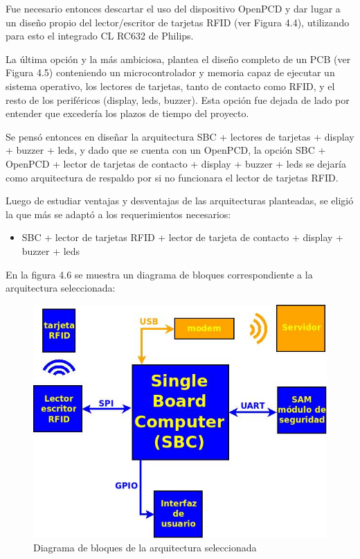 Fue necesario entonces descartar el uso del dispositivo OpenPCD y dar lugar a un diseño propio del lector/escritor de tarjetas RFID (ver Figura 4.4), utilizando para esto el integrado CL RC632 de Philips.

La última opción y la más ambiciosa, plantea el diseño completo de un PCB (ver Figura 4.5) conteniendo un microcontrolador y memoria capaz de ejecutar un sistema operativo, los lectores de tarjetas, tanto de contacto como RFID, y el resto de los periféricos (display, leds, buzzer). Esta opción fue dejada de lado por entender que excedería los plazos de tiempo del proyecto.

Se pensó entonces en diseñar la arquitectura SBC + lectores de tarjetas + display + buzzer + leds, y dado que se cuenta con un OpenPCD, la opción SBC + OpenPCD + lector de tarjetas de contacto + display + buzzer + leds se dejaría como arquitectura de respaldo por si no funcionara el lector de tarjetas RFID.

Luego de estudiar ventajas y desventajas de las arquitecturas planteadas, se eligió la que más se adaptó a los requerimientos necesarios:

\begin{itemize}
\item SBC +  lector de tarjetas RFID + lector de tarjeta de contacto + display + buzzer + leds
\end{itemize}

En la figura 4.6 se muestra un diagrama de bloques correspondiente a la arquitectura seleccionada:

\begin{figure}[H]
\centering
  \begin{center}
  \includegraphics[scale=.5]{Imagenes/diagrama_rf2.jpg} 
  \end{center}
  \caption{Diagrama de bloques de la arquitectura seleccionada}\label{Fig:HW_GRAL} 
\end{figure}



